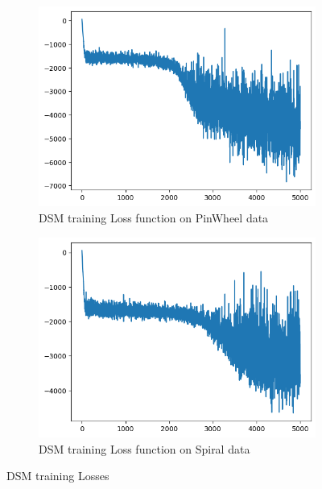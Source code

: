 \documentclass[11pt]{article}
\begin{document}
\begin{figure}[H]
\begin{subfigure}{0.45\textwidth}
			\includegraphics[width=\textwidth]{DSM_Pin_loss.png}
			\caption{DSM training Loss function on PinWheel data}
			\label{fig:DSMPinLoss}
		\end{subfigure}
		\hfill
		\begin{subfigure}{0.45\textwidth}
			\centering
			\includegraphics[width=\textwidth]{DSM_Spin_loss.png}
			\caption{DSM training Loss function on Spiral data}
			\label{fig:DSMSpinLoss}
		\end{subfigure}
		
		\caption{DSM training Losses}
		\label{DSMTLoss}
	\end{figure}
\end{document}
